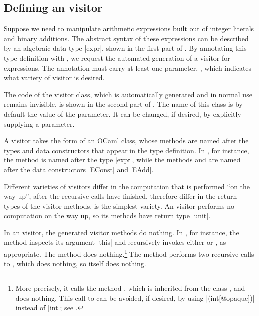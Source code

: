 \documentclass[11pt,a4paper,twoside]{article}
\begin{document}
\subsection{Defining an \iter visitor}
\label{sec:intro:iter:def}

Suppose we need to manipulate arithmetic expressions built out of integer
literals and binary additions. The abstract syntax of these expressions can be
described by an algebraic data type \oc|expr|, shown in the first part of
.
%
By annotating this type definition with \derivingvisitors, we request the
automated generation of a visitor for expressions. The annotation
\derivingvisitors must carry at least one parameter, \variety, which indicates
what variety of visitor is desired.

The code of the visitor class, which is automatically generated and in normal
use remains invisible, is shown in the second part of . The
name of this class is by default the value of the \variety parameter. It can
be changed, if desired, by explicitly supplying a \name parameter.

A visitor takes the form of an OCaml class, whose methods are named after the
types and data constructors that appear in the type definition. In
, for instance, the method  is named after
the type \oc|expr|, while the methods  and
 are named after the data constructors \oc|EConst| and
\oc|EAdd|.

Different varieties of visitors differ in the computation that is performed
``on the way up'', after the recursive calls have finished, therefore differ
in the return types of the visitor methods. \iter is the simplest variety. An
\iter visitor performs no computation on the way up, so its methods have
return type \oc|unit|.

In an \iter visitor, the generated visitor methods do nothing. In
, for instance, the method  inspects its
argument \oc|this| and recursively invokes either  or
, as appropriate. The method  does
nothing.\footnote{More precisely, it calls the method ,
  which is inherited from the class , and does
  nothing. This call to  can be avoided, if desired, by using
  \oc|(int[@opaque])| instead of \oc|int|; see .} The method
 performs two recursive calls to ,
which does nothing, so  itself does nothing.
\end{document}
